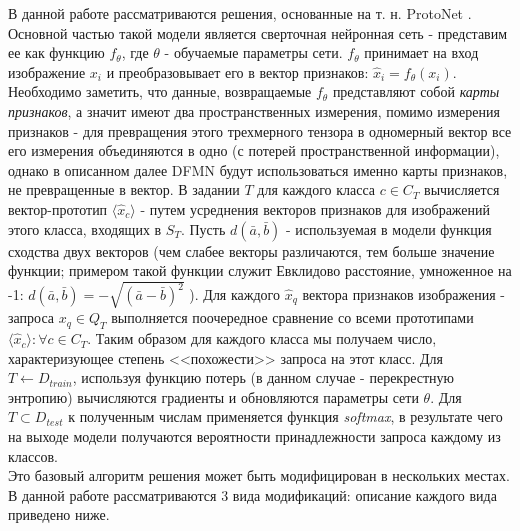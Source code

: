 \documentclass[a4paper, 12pt]{report}
\begin{document}
В данной работе рассматриваются решения, основанные на т. н. ProtoNet \cite{closerlook}. Основной частью такой модели является сверточная нейронная сеть - представим ее как функцию $f_{\theta}$, где $\theta$ - обучаемые параметры сети. $f_{\theta}$ принимает на вход изображение $x_i$ и преобразовывает его в вектор признаков: $\hat{x}_i = f_{\theta}(x_i)$. Необходимо заметить, что данные, возвращаемые $f_{\theta}$ представляют собой \textit{карты признаков}, а значит имеют два пространственных измерения, помимо измерения признаков - для превращения этого трехмерного тензора в одномерный вектор все его измерения объединяются в одно (с потерей пространственной информации), однако в описанном далее DFMN будут использоваться именно карты признаков, не превращенные в вектор.  В задании $T$ для каждого класса $c \in C_T$ вычисляется вектор-прототип $\langle  \hat{x}_c \rangle$ - путем усреднения векторов признаков для изображений этого класса, входящих в $S_T$. Пусть $d(\bar{a}, \bar{b})$ - используемая в модели функция сходства двух векторов (чем слабее векторы различаются, тем больше значение функции; примером такой функции служит Евклидово расстояние, умноженное на -1: $d(\bar{a}, \bar{b}) = -\sqrt{{(\bar{a} - \bar{b})}^2}$ ). Для каждого $ \hat{x}_q  $ вектора признаков изображения - запроса $x_q \in Q_T$ выполняется поочередное сравнение со всеми прототипами $\langle \hat{x}_c \rangle : \forall c \in C_T$. Таким образом для каждого класса мы получаем число, характеризующее степень <<похожести>> запроса на этот класс. Для $T \leftarrow D_{train}$, используя функцию потерь (в данном случае - перекрестную энтропию) вычисляются градиенты и обновляются параметры сети $\theta$. Для $T \subset D_{test}$ к полученным числам применяется функция \textit{softmax}, в результате чего на выходе модели получаются вероятности принадлежности запроса каждому из классов. \\

Это базовый алгоритм решения может быть модифицирован в нескольких местах. В данной работе рассматриваются 3 вида модификаций: описание каждого вида приведено ниже.
\end{document}

